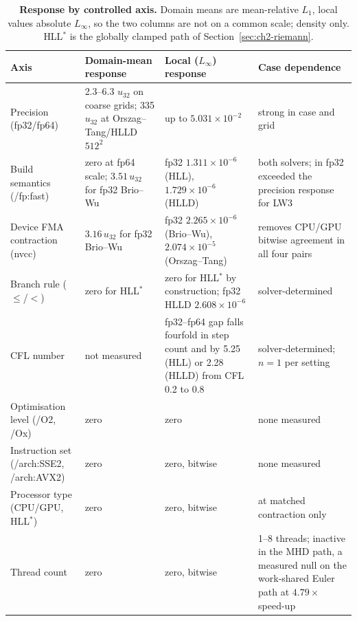 \begin{table}[htbp]
\centering
\small
\begin{tabularx}{\textwidth}{@{}p{}XXX@{}}
\toprule
Axis & Domain-mean response & Local ($L_\infty$) response & Case dependence \\
\midrule
Precision (fp32/fp64) & 2.3--6.3 $u_{32}$ on coarse grids; 335 $u_{32}$ at
Orszag--Tang/HLLD $512^2$ & up to $5.031\times10^{-2}$ & strong in case and
grid \\
Build semantics (/fp:fast) & zero at fp64 scale; $3.51\,u_{32}$ for fp32
Brio--Wu & fp32 $1.311\times10^{-6}$
(HLL), $1.729\times10^{-6}$ (HLLD) & both solvers; in fp32 exceeded the
precision response for LW3 \\
Device FMA contraction (nvcc) & $3.16\,u_{32}$ for fp32 Brio--Wu & fp32
$2.265\times10^{-6}$ (Brio--Wu), $2.074\times10^{-5}$ (Orszag--Tang) & removes
CPU/GPU bitwise agreement in all four pairs \\
Branch rule ($\le$/$<$) & zero for HLL$^{\ast}$ & zero for HLL$^{\ast}$ by
construction; fp32 HLLD $2.608\times10^{-6}$ & solver-determined \\
CFL number & not measured & fp32--fp64 gap falls fourfold in step count and by
5.25 (HLL) or 2.28 (HLLD) from CFL 0.2 to 0.8 & solver-determined; $n=1$ per
setting \\
Optimisation level (/O2, /Ox) & zero & zero & none measured \\
Instruction set (/arch:SSE2, /arch:AVX2) & zero & zero, bitwise & none
measured \\
Processor type (CPU/GPU, HLL$^{\ast}$) & zero & zero, bitwise & at matched
contraction only \\
Thread count & zero & zero, bitwise & 1--8 threads; inactive in the MHD path,
a measured null on the work-shared Euler path at $4.79\times$ speed-up \\
\bottomrule
\end{tabularx}
\caption[Response by controlled axis]{\textbf{Response by controlled axis.}
Domain means are mean-relative $L_1$, local values absolute $L_\infty$, so the
two columns are not on a common scale; density only. HLL$^{\ast}$ is the
globally clamped path of Section~\ref{sec:ch2-riemann}.}
\label{tab:ch6-axis-ranking}
\end{table}

